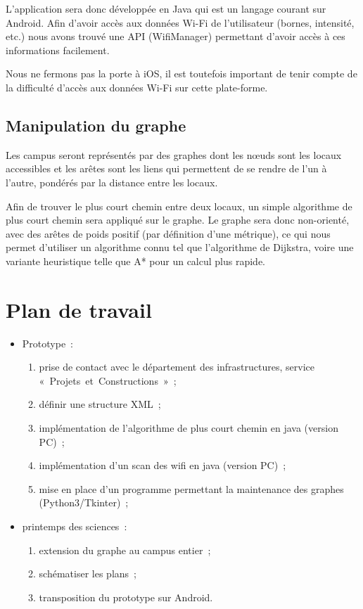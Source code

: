 \documentclass[a4paper,11pt]{article}
\begin{document}
		L'application sera donc développée en Java qui est un langage courant sur Android. Afin d'avoir accès aux données Wi-Fi de l'utilisateur (bornes, intensité, etc.) nous
		avons trouvé une API (WifiManager) permettant d'avoir accès à ces informations facilement.

		Nous ne fermons pas la porte à iOS, il est toutefois important de tenir compte de la difficulté d'accès aux données Wi-Fi sur cette plate-forme.

	\subsection{Manipulation du graphe}
		Les campus seront représentés par des graphes dont les nœuds sont les locaux accessibles et les arêtes sont les liens qui permettent de se rendre de l'un à l'autre,
		pondérés par la distance entre les locaux.

		Afin de trouver le plus court chemin entre deux locaux, un simple algorithme de plus court chemin sera appliqué sur le graphe.
		Le graphe sera donc non-orienté, avec des arêtes de poids positif (par définition d'une métrique), ce qui nous permet d'utiliser un algorithme connu tel que
		l'algorithme de Dijkstra, voire une variante heuristique telle que A* pour un calcul plus rapide.

\section{Plan de travail}
  \begin{itemize}
	\item Prototype~:
	  \begin{enumerate}
	    \item prise de contact avec le département des infrastructures, service «~Projets~et~Constructions~»~;
	    \item définir une structure XML~;
	    \item implémentation de l'algorithme de plus court chemin en java (version PC)~;
	    \item implémentation d'un scan des wifi en java (version PC)~;
	    \item mise en place d'un programme permettant la maintenance des graphes (Python3/Tkinter)~;
	  \end{enumerate}
	\item printemps des sciences~:
	  \begin{enumerate}
	    \item extension du graphe au campus entier~;
	    \item schématiser les plans~;
	    \item transposition du prototype sur Android.
	  \end{enumerate}
  \end{itemize}
\end{document}
